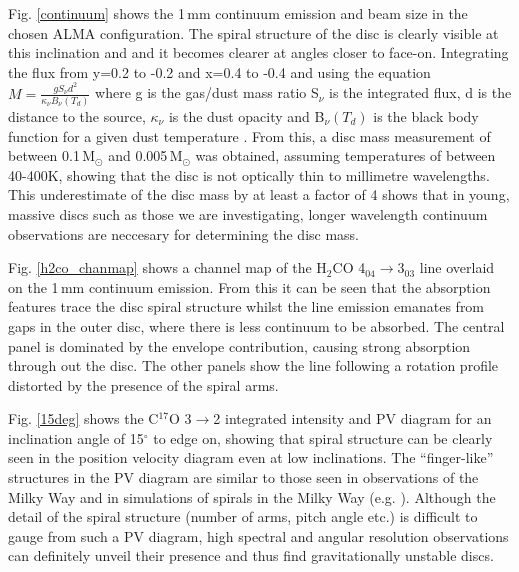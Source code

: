 \documentclass[useAMS,usenatbib]{mn2e}
\begin{document}
Fig. \ref{continuum} shows the 1\,mm continuum emission and beam size in the chosen ALMA configuration. The spiral structure of the disc is clearly visible at this inclination and and it becomes clearer at angles closer to face-on. Integrating the flux from y=0.2 to -0.2 and x=0.4 to -0.4 and using the equation $M=\frac{g S_\nu d^2}{\kappa_\nu B_\nu(T_d)}$ where g is the gas/dust mass ratio S$_\nu$ is the integrated flux, d is the distance to the source, $\kappa_\nu$ is the dust opacity and B$_\nu(T_d)$ is the black body function for a given dust temperature \citep{Beltran2006}. From this, a disc mass measurement of between 0.1$\,$M$_\odot$ and 0.005$\,$M$_\odot$ was obtained, assuming temperatures of between 40-400K, showing that the disc is not optically thin to millimetre wavelengths. This underestimate of the disc mass by at least a factor of 4 shows that in young, massive discs such as those we are investigating, longer wavelength continuum observations are neccesary for determining the disc mass.\smallskip

Fig. \ref{h2co_chanmap} shows a channel map of the H$_2$CO 4$_{04}\rightarrow$3$_{03}$ line overlaid on the 1$\,$mm continuum emission. From this it can be seen that the absorption features trace the disc spiral structure whilst the line emission emanates from gaps in the outer disc, where there is less continuum to be absorbed. The central panel is dominated by the envelope contribution, causing strong absorption through out the disc. The other panels show the line following a rotation profile distorted by the presence of the spiral arms. \smallskip

Fig. \ref{15deg} shows the C$^{17}$O 3$\rightarrow$2 integrated intensity and PV diagram for an inclination angle of 15$^\circ$ to edge on, showing that spiral structure can be clearly seen in the position velocity diagram even at low inclinations. The ``finger-like'' structures in the PV diagram are similar to those seen in observations of the Milky Way and in simulations of spirals in the Milky Way (e.g. \citealt{Bissantz2003}). Although the detail of the spiral structure (number of arms, pitch angle etc.) is difficult to gauge from such a PV diagram, high spectral and angular resolution observations can definitely unveil their presence and thus find gravitationally unstable discs. \smallskip
\end{document}
